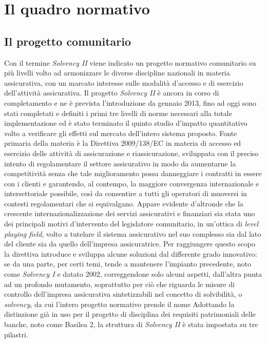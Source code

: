 \chapter{Il quadro normativo}

\section{Il progetto comunitario}
Con il termine \textit{\textit{Solvency I}I} viene indicato un progetto normativo comunitario su più livelli volto ad armonizzare le diverse discipline nazionali in materia assicurativa, con un marcato interesse sulle modalità d’accesso e di esercizio dell’attività assicurativa.
Il progetto \textit{\textit{Solvency I}I} è ancora in corso di completamento e ne è prevista l’introduzione da gennaio 2013, fino ad oggi sono stati completati e definiti i primi tre livelli di norme necessari alla totale implementazione ed è stato terminato il quinto studio d’impatto quantitativo volto a verificare gli effetti sul mercato dell’intero sistema proposto.
Fonte primaria della materia è la Direttiva 2009/138/EC in materia di accesso ed esercizio delle attività di assicurazione e riassicurazione, sviluppata con il preciso intento di regolamentare il settore assicurativo in modo da aumentarne la competitività senza che tale miglioramento possa danneggiare i contratti in essere con i clienti e garantendo, al contempo, la maggiore convergenza internazionale e intersettoriale possibile, così da consentire a tutti gli operatori di muoversi in contesti regolamentari che si equivalgano.
Appare evidente d’altronde che la crescente internazionalizzazione dei servizi assicurativi e finanziari sia stata uno dei principali motivi d’intervento del legislatore comunitario, in un’ottica di {\itshape level playing field}, volto a tutelare il sistema assicurativo nel suo complesso sia dal lato del cliente sia da quello dell’impresa assicuratrice.
Per raggiungere questo scopo la direttiva introduce e sviluppa alcune soluzioni dal differente grado innovativo: se da una parte, per certi temi, tende a mantenere l’impianto precedente, noto come \textit{Solvency I} e datato 2002, correggendone solo alcuni aspetti, dall’altra punta ad un profondo mutamento, soprattutto per ciò che riguarda le misure di controllo dell’impresa assicurativa sintetizzabili nel concetto di solvibilità, o \textit{solvency}, da cui l’intero progetto normativo prende il nome
Adottando la distinzione già in uso per il progetto di disciplina dei requisiti patrimoniali delle banche, noto come Basilea 2, la struttura di \textit{\textit{Solvency I}I} è stata impostata su tre pilastri.
